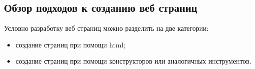 \subsection{Обзор подходов к созданию веб страниц}

Условно разработку веб страниц можно разделить на две категории:
\begin{itemize}
	\item создание страниц при помощи \gls{html};
	\item создание страниц при помощи конструкторов или аналогичных инструментов.
\end{itemize}